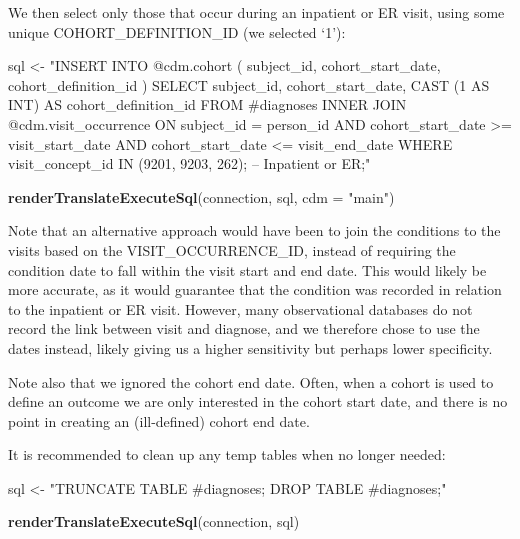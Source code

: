 \documentclass[11pt]{book}
\newenvironment{Shaded}{\begin{snugshade}}{\end{snugshade}}
\newcommand{\KeywordTok}[1]{\textcolor[rgb]{0.13,0.29,0.53}{\textbf{#1}}}
\newcommand{\DataTypeTok}[1]{\textcolor[rgb]{0.13,0.29,0.53}{#1}}
\newcommand{\StringTok}[1]{\textcolor[rgb]{0.31,0.60,0.02}{#1}}
\newcommand{\NormalTok}[1]{#1}
\theoremstyle{definition}
\theoremstyle{definition}
\theoremstyle{definition}
\theoremstyle{remark}
\begin{document}
We then select only those that occur during an inpatient or ER visit,
using some unique COHORT\_DEFINITION\_ID (we selected `1'):

\begin{Shaded}
\begin{Highlighting}[]
\NormalTok{sql <-}\StringTok{ "INSERT INTO @cdm.cohort (}
\StringTok{  subject_id, }
\StringTok{  cohort_start_date, }
\StringTok{  cohort_definition_id}
\StringTok{  )}
\StringTok{SELECT subject_id,}
\StringTok{  cohort_start_date,}
\StringTok{  CAST (1 AS INT) AS cohort_definition_id}
\StringTok{FROM #diagnoses}
\StringTok{INNER JOIN @cdm.visit_occurrence}
\StringTok{  ON subject_id = person_id}
\StringTok{    AND cohort_start_date >= visit_start_date}
\StringTok{    AND cohort_start_date <= visit_end_date}
\StringTok{WHERE visit_concept_id IN (9201, 9203, 262); -- Inpatient or ER;"}

\KeywordTok{renderTranslateExecuteSql}\NormalTok{(connection, sql, }\DataTypeTok{cdm =} \StringTok{"main"}\NormalTok{)}
\end{Highlighting}
\end{Shaded}

Note that an alternative approach would have been to join the conditions
to the visits based on the VISIT\_OCCURRENCE\_ID, instead of requiring
the condition date to fall within the visit start and end date. This
would likely be more accurate, as it would guarantee that the condition
was recorded in relation to the inpatient or ER visit. However, many
observational databases do not record the link between visit and
diagnose, and we therefore chose to use the dates instead, likely giving
us a higher sensitivity but perhaps lower specificity.

Note also that we ignored the cohort end date. Often, when a cohort is
used to define an outcome we are only interested in the cohort start
date, and there is no point in creating an (ill-defined) cohort end
date.

It is recommended to clean up any temp tables when no longer needed:

\begin{Shaded}
\begin{Highlighting}[]
\NormalTok{sql <-}\StringTok{ "TRUNCATE TABLE #diagnoses;}
\StringTok{DROP TABLE #diagnoses;"}

\KeywordTok{renderTranslateExecuteSql}\NormalTok{(connection, sql)}
\end{Highlighting}
\end{Shaded}
\end{document}
